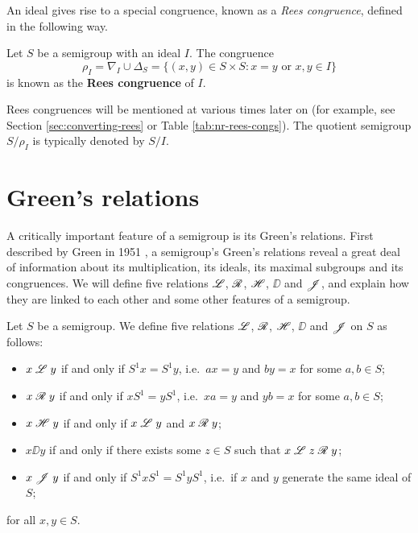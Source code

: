 An ideal gives rise to a special congruence, known as a \textit{Rees
  congruence}, defined in the following way.

\begin{definition}
  \label{def:rees-congruence}
  Let $S$ be a semigroup with an ideal $I$.  The congruence
  $$\rho_I = \nabla_I \cup \Delta_S
  = \{(x,y) \in S \times S : x=y \text{~or~} x,y \in I\}$$
  is known as the \textbf{Rees congruence} of $I$.
\end{definition}

Rees congruences will be mentioned at various times later on (for example, see
Section \ref{sec:converting-rees} or Table \ref{tab:nr-rees-congs}).  The
quotient semigroup $S / \rho_I$ is typically denoted by $S / I$.

\section{Green's relations}
\label{sec:intro-greens}

A critically important feature of a semigroup is its Green's relations.  First
described by Green in 1951 \cite{green}, a semigroup's Green's relations reveal
a great deal of information about its multiplication, its ideals, its maximal
subgroups and its congruences.  We will define five relations $\mathrel{\mathscr{L}}$, $\mathrel{\mathscr{R}}$,
$\mathrel{\mathscr{H}}$, $\DD$ and $\mathrel{\mathscr{J}}$, and explain how they are linked to each other and some
other features of a semigroup.

\begin{definition}
  \label{def:greens-relations}

  Let $S$ be a semigroup.  We define five relations $\mathrel{\mathscr{L}}$, $\mathrel{\mathscr{R}}$, $\mathrel{\mathscr{H}}$, $\DD$
  and $\mathrel{\mathscr{J}}$ on $S$ as follows:
  \begin{itemize}
  \item $x \mathrel{\mathscr{L}} y$ if and only if $S^1x = S^1y$, i.e.~$ax=y$ and $by=x$ for
    some $a,b \in S$;
  \item $x \mathrel{\mathscr{R}} y$ if and only if $xS^1 = yS^1$, i.e.~$xa=y$ and $yb=x$ for
    some $a,b \in S$;
  \item $x \mathrel{\mathscr{H}} y$ if and only if $x \mathrel{\mathscr{L}} y$ and $x \mathrel{\mathscr{R}} y$;
  \item $x \DD y$ if and only if there exists some $z \in S$ such that
    $x \mathrel{\mathscr{L}} z \mathrel{\mathscr{R}} y$;
  \item $x \mathrel{\mathscr{J}} y$ if and only if $S^1xS^1 = S^1yS^1$, i.e.~if $x$ and $y$
    generate the same ideal of $S$;
  \end{itemize}
  for all $x,y \in S$.
\end{definition}

